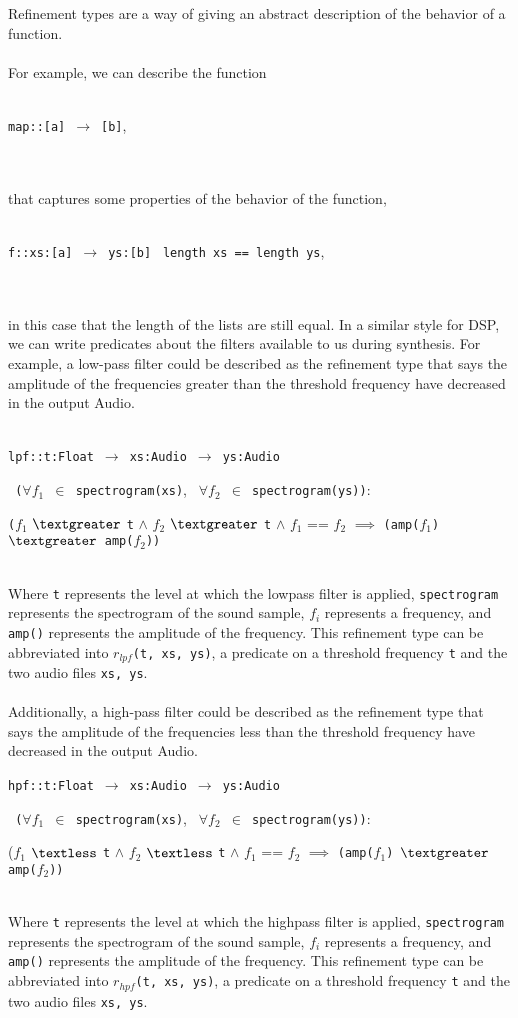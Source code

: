 \documentclass[english, 11pt]{article}
\begin{document}
Refinement types are a way of giving an abstract description of the behavior of a function. \\ \\
For example, we can describe the function \\ \\
\centerline{\texttt{map::[a]} $\,\to\,$ \texttt{[b]},}\\ \\
that captures some properties of the behavior of the function, \\ \\
\centerline{\texttt{f::xs:[a]} $\,\to\,$ \texttt{ys:[b]} \textbar \texttt{ length xs == length ys},} \\ \\
in this case that the length of the lists are still equal. In a similar style for DSP, we can write predicates about the filters available to us during synthesis. For example, a low-pass filter could be described as the refinement type that says the amplitude of the frequencies greater than the threshold frequency have decreased in the output Audio. \\ \\
\centerline{ \texttt{lpf::t:Float} $\,\to\,$  \texttt{xs:Audio} $\,\to\,$ \texttt{ys:Audio} \textbar}
\centerline{\texttt{ ($\forall$$f_1$ $\in$ spectrogram(xs)}, \texttt{ $\forall$$f_2$ $\in$ spectrogram(ys))}: } \centerline{\texttt{(}$f_1$ $\textgreater$ \texttt{t}  $\land$  $f_2$ $\textgreater$ \texttt{t}  $\land$  $f_1$ == $f_2$ $\implies$ \texttt{(amp($f_1$) $\textgreater$ amp($f_2$))}} ~\\
Where \texttt{t} represents the level at which the lowpass filter is applied, \texttt{spectrogram} represents the spectrogram of the sound sample, $f_i$ represents a frequency, and \texttt{amp()} represents the amplitude of the frequency. This refinement type can be abbreviated into \texttt{$r_{lpf}$(t, xs, ys)}, a predicate on a threshold frequency \texttt{t} and the two audio files \texttt{xs, ys}. \\ \\
Additionally, a high-pass filter could be described as the refinement type that says the amplitude of the frequencies less than the threshold frequency have decreased in the output Audio. \\

\centerline{ \texttt{hpf::t:Float} $\,\to\,$  \texttt{xs:Audio} $\,\to\,$ \texttt{ys:Audio} \textbar }
\centerline{\texttt{ ($\forall$$f_1$ $\in$ spectrogram(xs)}, \texttt{ $\forall$$f_2$ $\in$ spectrogram(ys))}: } \centerline{($f_1$ $\textless$ \texttt{t}  $\land$  $f_2$ $\textless$ \texttt{t}  $\land$  $f_1$ == $f_2$ $\implies$ \texttt{(amp($f_1$) $\textgreater$ amp($f_2$))}} ~\\
Where \texttt{t} represents the level at which the highpass filter is applied, \texttt{spectrogram} represents the spectrogram of the sound sample, $f_i$ represents a frequency, and \texttt{amp()} represents the amplitude of the frequency. This refinement type can be abbreviated into \texttt{$r_{hpf}$(t, xs, ys)}, a predicate on a threshold frequency \texttt{t} and the two audio files \texttt{xs, ys}.
\end{document}
